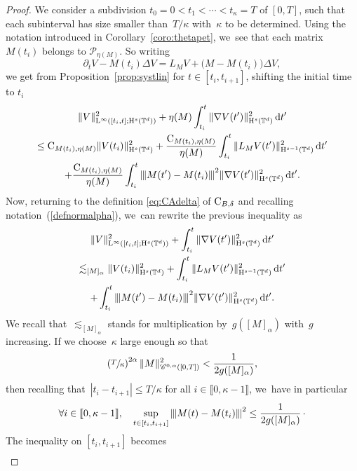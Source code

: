\documentclass[JEP,XML,SOM,Unicode,published]{cedram}
\theoremstyle{definition}
\newcommand\T{\mathbb{T}}
\newcommand\dd{\mathrm{d}}
\renewcommand\H{\mathrm{H}}
\renewcommand\L{\mathrm{L}}
\newcommand{\vertiii}[1]{{\vert\kern-0.08em\vert\kern-0.08em\vert #1 \vert\kern-0.08em\vert\kern-0.08em\vert}}
\begin{document}
\begin{proof}
We consider a subdivision $t_0=0<t_1<\cdots < t_\kappa = T$ of $[0,T]$, such that each subinterval has size smaller than~$T/\kappa$ with~$\kappa$ to be determined. Using the notation introduced in Corollary~\ref{coro:thetapet}, we~see that each matrix $M(t_i)$ belongs to $\mathscr{P}_{\eta(M)}$. So writing
\[
\partial_t V - M(t_i)\Delta V = L_{M }V + \bigl(M-M(t_i)\bigr)\Delta V,
\]
we get from Proposition~\ref{prop:systlin} for $t\in[t_i,t_{i+1}]$, shifting the initial time to $t_i$\vspace*{-5pt}
\begin{multline*}
\|V\|_{\L^\infty([t_i,t];\H^s(\T^d))}^2 + \eta(M)\int_{t_i}^{t} \|\nabla V(t')\|_{\H^s(\T^d)}^2\,\dd t'\\
\leq \textnormal{C}_{M(t_i),\eta(M)} \|V(t_i)\|_{\H^s(\T^d)}^2 + \frac{\textnormal{C}_{M(t_i),\eta(M)}}{\eta(M)} \int_{t_i}^t\|L_{M }V(t')\|_{\H^{s-1}(\T^d)}^2\,\dd t' \\
+ \frac{\textnormal{C}_{M(t_i),\eta(M)}}{\eta(M)} \int_{t_i}^t \vertiii{M(t')-M(t_i)}^2 \|\nabla V(t')\|_{\H^s(\T^d)}^2\,\dd t'.
\end{multline*}
Now, returning to the definition \eqref{eq:CAdelta} of $\textnormal{C}_{B,\delta}$ and recalling notation~(\ref{defnormalpha}), we~can rewrite the previous inequality as
\begin{multline*}
\|V\|_{\L^\infty([t_i,t];\H^s(\T^d))}^2 + \int_{t_i}^{t} \|\nabla V(t')\|_{\H^s(\T^d)}^2\,\dd t'\\
\lesssim_{[M]_\alpha} \|V(t_i)\|_{\H^s(\T^d)}^2
+ \int_{t_i}^t\|L_{M }V(t')\|_{\H^{s-1}(\T^d)}^2\,\dd t' \\
+ \int_{t_i}^t \vertiii{M(t')-M(t_i)}^2 \|\nabla V(t')\|_{\H^s(\T^d)}^2\,\dd t'.
\end{multline*}
We recall that~$\lesssim_{[M]_\alpha}$ stands for multiplication by~$g([M]_\alpha)$ with~$g$ increasing.
If we choose~$ \kappa$ large enough so that
\begin{equation}\label{ineq:L}
\left(\sfrac{T}\kappa\right)^{2\alpha} \|M\|_{\mathscr{C}^{0,\alpha}([0,T])}^2 < \frac{1}{2g([M]_\alpha)},
\end{equation}
then recalling that~$|t_i-t_{i+1 }| \leq T/\kappa $ for all $i\in\llbracket 0,\kappa-1\rrbracket$, we~have in particular
\[
\forall i\in\llbracket 0,\kappa-1\rrbracket, \quad \sup_{t \in [t_i,t_{i+1}]} \vertiii{M(t)-M(t_i)}^2 \leq \frac{1}{2g([M]_\alpha)} \, \cdotp
\]
The inequality on $[t_i,t_{i+1}]$ becomes
\begin{multline*}

\end{multline*}
\end{proof}
\end{document}
